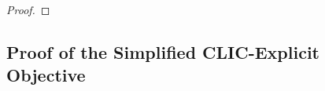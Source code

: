 \begin{proof}


    
\end{proof}

\subsection{Proof of the Simplified CLIC-Explicit Objective}
\label{apppendix:reduce_policy_improvemnt_inequality_Gaussian_assumption}

